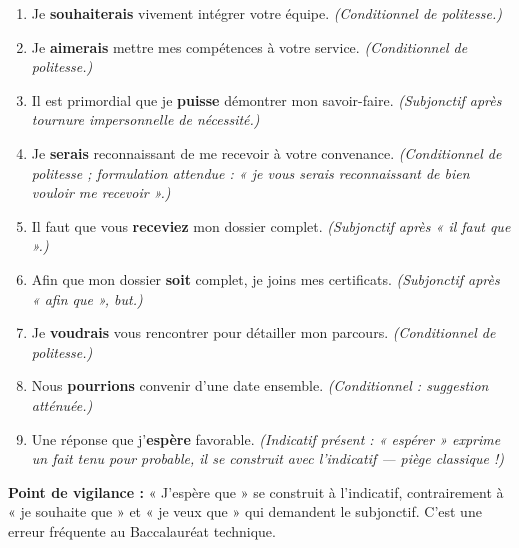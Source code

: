 \documentclass[11pt]{article}
\newcommand{\cle}[1]{{\popxbold\color{popdark}#1}}
\begin{document}
\begin{corrige}
\begin{enumerate}
\item Je \textbf{souhaiterais} vivement intégrer votre équipe. \textit{(Conditionnel de politesse.)}
\item Je \textbf{aimerais} mettre mes compétences à votre service. \textit{(Conditionnel de politesse.)}
\item Il est primordial que je \textbf{puisse} démontrer mon savoir-faire. \textit{(Subjonctif après tournure impersonnelle de nécessité.)}
\item Je \textbf{serais} reconnaissant de me recevoir à votre convenance. \textit{(Conditionnel de politesse ; formulation attendue : « je vous serais reconnaissant de bien vouloir me recevoir ».)}
\item Il faut que vous \textbf{receviez} mon dossier complet. \textit{(Subjonctif après « il faut que ».)}
\item Afin que mon dossier \textbf{soit} complet, je joins mes certificats. \textit{(Subjonctif après « afin que », but.)}
\item Je \textbf{voudrais} vous rencontrer pour détailler mon parcours. \textit{(Conditionnel de politesse.)}
\item Nous \textbf{pourrions} convenir d'une date ensemble. \textit{(Conditionnel : suggestion atténuée.)}
\item Une réponse que j'\textbf{espère} favorable. \textit{(Indicatif présent : « espérer » exprime un fait tenu pour probable, il se construit avec l'indicatif — piège classique !)}
\end{enumerate}

\textbf{Point de vigilance :} « J'espère que » se construit à l'\cle{indicatif}, contrairement à « je souhaite que » et « je veux que » qui demandent le subjonctif. C'est une erreur fréquente au Baccalauréat technique.
\end{corrige}
\end{document}

